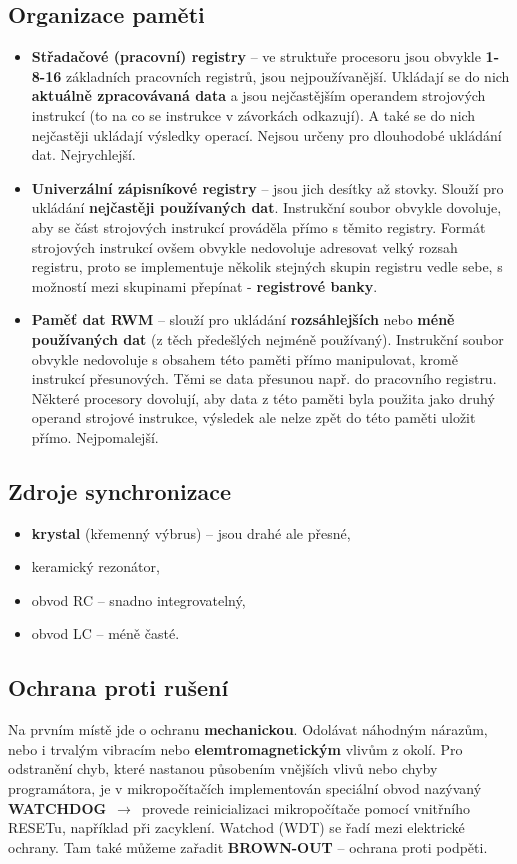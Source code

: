 \subsection{Organizace paměti}
\begin{itemize}
	\item \textbf{Střadačové (pracovní) registry }-- ve struktuře procesoru jsou obvykle \textbf{1-8-16} základních pracovních registrů, jsou nejpoužívanější. Ukládají se do nich \textbf{aktuálně zpracovávaná data} a jsou nejčastějším operandem strojových instrukcí (to na co se instrukce v závorkách odkazují). A také se do nich nejčastěji ukládají výsledky operací. Nejsou určeny pro dlouhodobé ukládání dat. Nejrychlejší.
	\item \textbf{Univerzální zápisníkové registry} -- jsou jich desítky až stovky. Slouží pro ukládání \textbf{nejčastěji používaných dat}. Instrukční soubor obvykle dovoluje, aby se část strojových instrukcí prováděla přímo s těmito registry. Formát strojových instrukcí ovšem obvykle nedovoluje adresovat velký rozsah registru, proto se implementuje několik stejných skupin registru vedle sebe, s možností mezi skupinami přepínat - \textbf{registrové banky}.
	\item \textbf{Paměť dat RWM} -- slouží pro ukládání \textbf{rozsáhlejších} nebo \textbf{méně používaných dat} (z těch předešlých nejméně používaný). Instrukční soubor obvykle nedovoluje s obsahem této paměti přímo manipulovat, kromě instrukcí přesunových. Těmi se data přesunou např. do pracovního registru. Některé procesory dovolují, aby data z této paměti byla použita jako druhý operand strojové instrukce, výsledek ale nelze zpět do této paměti uložit přímo. Nejpomalejší.
\end{itemize}

\subsection{Zdroje synchronizace}
\begin{itemize}
	\item \textbf{krystal} (křemenný výbrus) – jsou drahé ale přesné,
	\item keramický rezonátor,
	\item obvod RC -- snadno integrovatelný,
	\item obvod LC -- méně časté.
\end{itemize}

\subsection{Ochrana proti rušení}
Na prvním místě jde o ochranu \textbf{mechanickou}. Odolávat náhodným nárazům, nebo i trvalým vibracím nebo \textbf{elemtromagnetickým} vlivům z okolí. Pro odstranění chyb, které nastanou působením vnějších vlivů nebo chyby programátora, je v mikropočítačích implementován speciální obvod nazývaný \textbf{WATCHDOG} $\,\to\,$ provede reinicializaci mikropočítače pomocí vnitřního RESETu, například při zacyklení. Watchod (WDT) se řadí mezi elektrické ochrany. Tam také můžeme zařadit \textbf{BROWN-OUT} -- ochrana proti podpěti.


